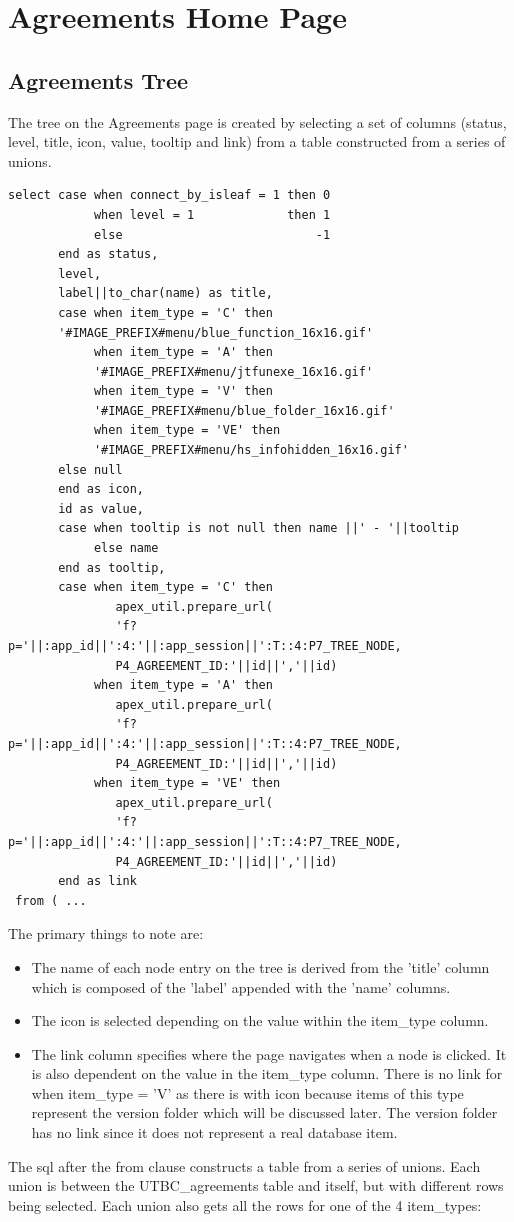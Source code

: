 \documentclass{report}
\begin{document}
\section{Agreements Home Page}

\subsection{Agreements Tree}
The tree on the Agreements page is created by selecting a set of columns (status, level, title, icon, value, tooltip and link) from a table constructed from a series of unions.

\begin{lstlisting}[caption=Agreement tree select statement]
select case when connect_by_isleaf = 1 then 0
            when level = 1             then 1
            else                           -1
       end as status, 
       level,
       label||to_char(name) as title, 
       case when item_type = 'C' then 
       '#IMAGE_PREFIX#menu/blue_function_16x16.gif' 
            when item_type = 'A' then 
            '#IMAGE_PREFIX#menu/jtfunexe_16x16.gif'
            when item_type = 'V' then 
            '#IMAGE_PREFIX#menu/blue_folder_16x16.gif'
            when item_type = 'VE' then 
            '#IMAGE_PREFIX#menu/hs_infohidden_16x16.gif'
       else null
       end as icon, 
       id as value, 
       case when tooltip is not null then name ||' - '||tooltip
            else name
       end as tooltip,
       case when item_type = 'C' then 
               apex_util.prepare_url(
               'f?p='||:app_id||':4:'||:app_session||':T::4:P7_TREE_NODE,
               P4_AGREEMENT_ID:'||id||','||id)
            when item_type = 'A' then
               apex_util.prepare_url(
               'f?p='||:app_id||':4:'||:app_session||':T::4:P7_TREE_NODE,
               P4_AGREEMENT_ID:'||id||','||id)
            when item_type = 'VE' then 
               apex_util.prepare_url(
               'f?p='||:app_id||':4:'||:app_session||':T::4:P7_TREE_NODE,
               P4_AGREEMENT_ID:'||id||','||id)
       end as link 
 from ( ...
\end{lstlisting}

The primary things to note are:
\begin{itemize}
	\item The name of each node entry on the tree is derived from the 'title' column which is composed of the 'label' appended with the 'name' columns.
  \item The icon is selected depending on the value within the item\_type column.
  \item The link column specifies where the page navigates when a node is clicked.  It is also dependent on the value in the item\_type column.  There is no link for when item\_type = 'V' as there is with icon because items of this type represent the version folder which will be discussed later.  The version folder has no link since it does not represent a real database item.
\end{itemize}
The sql after the from clause constructs a table from a series of unions.  Each union is between the UTBC\_agreements table and itself, but with different rows being selected.  Each union also gets all the rows for one of the 4 item\_types: 
\end{document}
